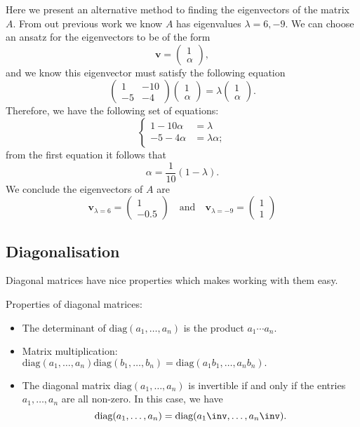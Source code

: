 \documentclass[12pt, a4paper]{article}
\begin{document}
\begin{mdexample}
    Here we present an alternative method to finding the eigenvectors of the matrix \(A\). From out previous work we know \(A\) has eigenvalues \(\lambda=6,-9\). We can choose an ansatz for the eigenvectors to be of the form 
    \[\bm{v} = \begin{pmatrix} 1 \\ \alpha \end{pmatrix},\]
    and we know this eigenvector must satisfy the following equation 
    \[\begin{pmatrix} 1 & -10 \\ -5 & -4 \end{pmatrix} \begin{pmatrix} 1 \\ \alpha \end{pmatrix} = \lambda \begin{pmatrix} 1 \\ \alpha \end{pmatrix}.\]
    Therefore, we have the following set of equations:
    \[\begin{cases}
        1-10\alpha &= \lambda \\
        -5-4\alpha &= \lambda \alpha;
    \end{cases}\]
    from the first equation it follows that 
    \[\alpha = \frac{1}{10}(1-\lambda).\]
    We conclude the eigenvectors of \(A\) are 
    \[\bm{v}_{\lambda =6} = \begin{pmatrix} 1 \\ -0.5 \end{pmatrix} \quad \text{and} \quad \bm{v}_{\lambda=-9} = \begin{pmatrix} 1 \\1\end{pmatrix}\]
\end{mdexample}

\subsection{Diagonalisation}

Diagonal matrices have nice properties which makes working with them easy.

\begin{proposition}
    Properties of diagonal matrices:
    \begin{itemize}
        \item The determinant of \(\text{diag}(a_1, \ldots, a_n)\) is the product \(a_1 \cdots a_n\).
        \item Matrix multiplication: \(\text{diag}(a_1, \ldots, a_n) \text{diag}(b_1, \ldots, b_n) = \text{diag}(a_1b_1, \ldots, a_nb_n).\)
        \item The diagonal matrix \(\text{diag}(a_1, \ldots, a_n)\) is invertible if and only if the entries \(a_1, \ldots, a_n\) are all non-zero. In this case, we have
        \[\text{diag}(a_1, \ldots, a_n) = \text{diag}(a_1\inv, \ldots, a_n\inv).\]
    \end{itemize}
\end{proposition}
\end{document}
